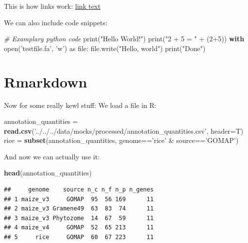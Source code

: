 \documentclass[utf8]{frontiersSCNS} %
\newenvironment{Shaded}{\begin{snugshade}}{\end{snugshade}}
\newcommand{\KeywordTok}[1]{\textcolor[rgb]{0.13,0.29,0.53}{\textbf{{#1}}}}
\newcommand{\DataTypeTok}[1]{\textcolor[rgb]{0.13,0.29,0.53}{{#1}}}
\newcommand{\DecValTok}[1]{\textcolor[rgb]{0.00,0.00,0.81}{{#1}}}
\newcommand{\CharTok}[1]{\textcolor[rgb]{0.31,0.60,0.02}{{#1}}}
\newcommand{\StringTok}[1]{\textcolor[rgb]{0.31,0.60,0.02}{{#1}}}
\newcommand{\CommentTok}[1]{\textcolor[rgb]{0.56,0.35,0.01}{\textit{{#1}}}}
\newcommand{\NormalTok}[1]{{#1}}
\begin{document}
This is how links work: \href{https://example.com/}{link text}

We can also include code snippets:

\begin{Shaded}
\begin{Highlighting}[]
\CommentTok{# Examplary python code}
\DataTypeTok{print}\NormalTok{(}\StringTok{"Hello World!"}\NormalTok{)}
\DataTypeTok{print}\NormalTok{(}\StringTok{"2 + 5 = "} \NormalTok{+ (}\DecValTok{2+5}\NormalTok{))}
\KeywordTok{with} \DataTypeTok{open}\NormalTok{(}\StringTok{'testfile.fa'}\NormalTok{, }\StringTok{'w'}\NormalTok{) }\CharTok{as} \DataTypeTok{file}\NormalTok{:}
  \DataTypeTok{file}\NormalTok{.write(}\StringTok{"Hello, world"}\NormalTok{)}
\DataTypeTok{print}\NormalTok{(}\StringTok{"Done"}\NormalTok{)}
\end{Highlighting}
\end{Shaded}

\section{Rmarkdown}\label{rmarkdown}

Now for some really kewl stuff: We load a file in R:

\begin{Shaded}
\begin{Highlighting}[]
\NormalTok{annotation_quantities =}\StringTok{ }
\StringTok{  }\KeywordTok{read.csv}\NormalTok{(}\StringTok{'../../../data/mocks/processed/annotation_quantities.csv'}\NormalTok{, }\DataTypeTok{header=}\NormalTok{T)}
\NormalTok{rice =}\StringTok{ }\KeywordTok{subset}\NormalTok{(annotation_quantities, genome==}\StringTok{'rice'} \NormalTok{&}\StringTok{ }\NormalTok{source==}\StringTok{'GOMAP'}\NormalTok{)}
\end{Highlighting}
\end{Shaded}

And now we can actually use it:

\begin{Shaded}
\begin{Highlighting}[]
\KeywordTok{head}\NormalTok{(annotation_quantities)}
\end{Highlighting}
\end{Shaded}

\begin{verbatim}
##     genome    source n_c n_f n_p n_genes
## 1 maize_v3     GOMAP  95  56 169      11
## 2 maize_v3 Gramene49  63  83  74      11
## 3 maize_v3 Phytozome  14  67  59      11
## 4 maize_v4     GOMAP  52  65 213      11
## 5     rice     GOMAP  60  67 223      11
\end{verbatim}
\end{document}
